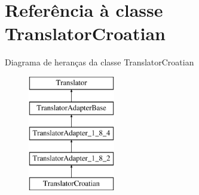 \hypertarget{class_translator_croatian}{\section{Referência à classe Translator\-Croatian}
\label{class_translator_croatian}
}
Diagrama de heranças da classe Translator\-Croatian\begin{figure}[H]
\begin{center}
\leavevmode
\includegraphics[height=5.000000cm]{class_translator_croatian}
\end{center}
\end{figure}
